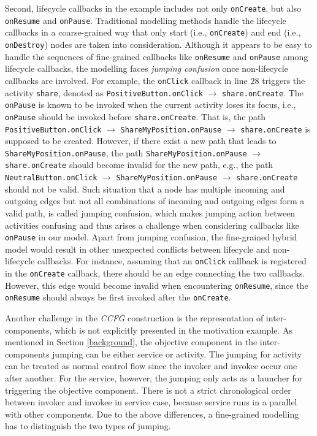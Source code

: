 Second, lifecycle callbacks in the example includes not only \texttt{onCreate}, but also
\texttt{onResume} and \texttt{onPause}. Traditional modelling methods handle the lifecycle callbacks in a coarse-grained way that only start (i.e., \texttt{onCreate}) and end (i.e., \texttt{onDestroy}) nodes are taken into consideration. Although it appears to be easy to handle the sequences of fine-grained callbacks like \texttt{onResume} and \texttt{onPause} among lifecycle callbacks, the modelling faces \textit{jumping confusion} once non-lifecycle callbacks are involved. For example, the \texttt{onClick} callback in line $28$ triggers the activity \texttt{share}, denoted as \texttt{PositiveButton.onClick} $\rightarrow$ \texttt{share.onCreate}. The \texttt{onPause} is known to be invoked when the current activity loses its focus, i.e., \texttt{onPause} should be invoked before \texttt{share.onCreate}. That is, the path \texttt{PositiveButton.onClick} $\rightarrow$ \texttt{ShareMyPosition.onPause} $\rightarrow$ \texttt{share.onCreate} is supposed to be created. However, if there exist a new path that leads to
\texttt{ShareMyPosition.onPause}, the path \texttt{ShareMyPosition.onPause} $\rightarrow$ \texttt{share.onCreate} should become invalid for the new path, e.g., the path \texttt{NeutralButton.onClick} $\rightarrow$ \texttt{ShareMyPosition.onPause} $\rightarrow$ \texttt{share.onCreate} should not be valid. Such situation that a node has multiple incoming and outgoing edges but not all combinations of incoming and outgoing edges form a valid path, is called jumping confusion, which makes jumping action between activities confusing and thus arises a challenge when considering callbacks like \texttt{onPause} in our model. Apart from jumping confusion, the fine-grained hybrid model would result in other unexpected conflicts between lifecycle and non-lifecycle callbacks. For instance, assuming that an \texttt{onClick} callback is registered in the \texttt{onCreate} callback, there should be an edge connecting the two callbacks. However, this edge would become invalid when encountering \texttt{onResume}, since the \texttt{onResume} should always be first invoked after the \texttt{onCreate}.

Another challenge in the \textit{CCFG} construction is the representation of inter-components, which is not explicitly presented in the motivation example. As mentioned in Section \ref{background}, the objective component in the inter-components jumping can be either service or activity. The jumping for activity can be treated as normal control flow since the invoker and invokee occur one after another. For the service, however, the jumping only acts as a launcher for triggering the objective component. There is not a strict chronological order between invoker and invokee in service case, because service runs in a parallel with other components. Due to the above differences, a fine-grained modelling has to distinguish the two types of jumping.

